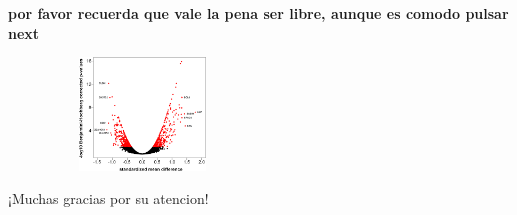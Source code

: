 \documentclass[11pt]{beamer}
\begin{document}

	\begin{frame}
	\centering
	\large \textbf{por favor recuerda que vale la pena ser libre, aunque es comodo pulsar next}
	\begin{figure}[h!] 
		\centering
		\includegraphics[width=5cm, height=3cm]{volcan.png}
		\end{figure}
	
	¡Muchas gracias por su atencion!
	\end{frame}
\end{document}
